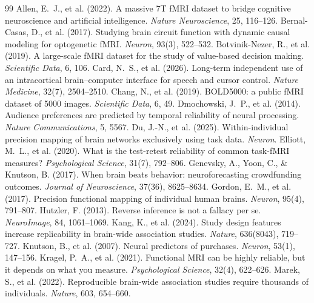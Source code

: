 \documentclass[11pt]{article}
\begin{document}
\begin{thebibliography}{99}\small
{} Allen, E.~J., et al. (2022). A massive 7T fMRI dataset to bridge cognitive neuroscience and artificial intelligence. \emph{Nature Neuroscience}, 25, 116--126.
 Bernal-Casas, D., et al. (2017). Studying brain circuit function with dynamic causal modeling for optogenetic fMRI. \emph{Neuron}, 93(3), 522--532.
 Botvinik-Nezer, R., et al. (2019). A large-scale fMRI dataset for the study of value-based decision making. \emph{Scientific Data}, 6, 106.
 Card, N.~S., et al. (2026). Long-term independent use of an intracortical brain--computer interface for speech and cursor control. \emph{Nature Medicine}, 32(7), 2504--2510.
 Chang, N., et al. (2019). BOLD5000: a public fMRI dataset of 5000 images. \emph{Scientific Data}, 6, 49.
 Dmochowski, J.~P., et al. (2014). Audience preferences are predicted by temporal reliability of neural processing. \emph{Nature Communications}, 5, 5567.
 Du, J.-N., et al. (2025). Within-individual precision mapping of brain networks exclusively using task data. \emph{Neuron}.
 Elliott, M.~L., et al. (2020). What is the test-retest reliability of common task-fMRI measures? \emph{Psychological Science}, 31(7), 792--806.
 Genevsky, A., Yoon, C., \& Knutson, B. (2017). When brain beats behavior: neuroforecasting crowdfunding outcomes. \emph{Journal of Neuroscience}, 37(36), 8625--8634.
 Gordon, E.~M., et al. (2017). Precision functional mapping of individual human brains. \emph{Neuron}, 95(4), 791--807.
 Hutzler, F. (2013). Reverse inference is not a fallacy per se. \emph{NeuroImage}, 84, 1061--1069.
 Kang, K., et al. (2024). Study design features increase replicability in brain-wide association studies. \emph{Nature}, 636(8043), 719--727.
 Knutson, B., et al. (2007). Neural predictors of purchases. \emph{Neuron}, 53(1), 147--156.
 Kragel, P.~A., et al. (2021). Functional MRI can be highly reliable, but it depends on what you measure. \emph{Psychological Science}, 32(4), 622--626.
 Marek, S., et al. (2022). Reproducible brain-wide association studies require thousands of individuals. \emph{Nature}, 603, 654--660.

\end{thebibliography}
\end{document}
